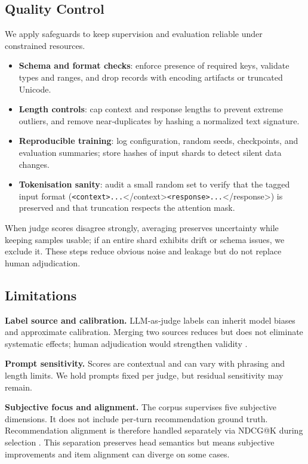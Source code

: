 \documentclass[12pt]{article}
\begin{document}
  \subsection{Quality Control}
  We apply safeguards to keep supervision and evaluation reliable under constrained resources.
  \begin{itemize}[leftmargin=*]
    \item \textbf{Schema and format checks}: enforce presence of required keys, validate types and ranges, and drop records with encoding artifacts or truncated Unicode.
    \item \textbf{Length controls}: cap context and response lengths to prevent extreme outliers, and remove near‑duplicates by hashing a normalized text signature.
    \item \textbf{Reproducible training}: log configuration, random seeds, checkpoints, and evaluation summaries; store hashes of input shards to detect silent data changes.
    \item \textbf{Tokenisation sanity}: audit a small random set to verify that the tagged input format (\texttt{<context>...}</context>\texttt{<response>...}</response>) is preserved and that truncation respects the attention mask.
  \end{itemize}
  When judge scores disagree strongly, averaging preserves uncertainty while keeping samples usable; if an entire shard exhibits drift or schema issues, we exclude it. These steps reduce obvious noise and leakage but do not replace human adjudication.
  
  \subsection{Limitations}
  \textbf{Label source and calibration.} LLM‑as‑judge labels can inherit model biases and approximate calibration. Merging two sources reduces but does not eliminate systematic effects; human adjudication would strengthen validity \citep{yan2023llmjudge}.

  \textbf{Prompt sensitivity.} Scores are contextual and can vary with phrasing and length limits. We hold prompts fixed per judge, but residual sensitivity may remain.

  \textbf{Subjective focus and alignment.} The corpus supervises five subjective dimensions. It does not include per‑turn recommendation ground truth. Recommendation alignment is therefore handled separately via NDCG@K during selection \citep{evidently_ndcg}. This separation preserves head semantics but means subjective improvements and item alignment can diverge on some cases.
\end{document}
